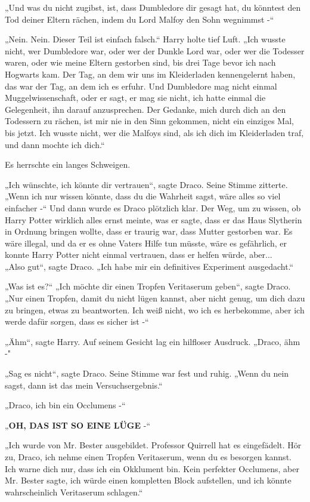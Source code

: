 {„Und was du nicht zugibst, ist, dass Dumbledore dir gesagt hat, du könntest den Tod deiner Eltern rächen, indem du Lord Malfoy den Sohn wegnimmst -“

„Nein. Nein. Dieser Teil ist einfach falsch.“ Harry holte tief Luft. „Ich wusste nicht, wer Dumbledore war, oder wer der Dunkle Lord war, oder wer die Todesser waren, oder wie meine Eltern gestorben sind, bis drei Tage bevor ich nach Hogwarts kam. Der Tag, an dem wir uns im Kleiderladen kennengelernt haben, das war der Tag, an dem ich es erfuhr. Und Dumbledore mag nicht einmal Muggelwissenschaft, oder er sagt, er mag sie nicht, ich hatte einmal die Gelegenheit, ihn darauf anzusprechen. Der Gedanke, mich durch dich an den Todessern zu rächen, ist mir nie in den Sinn gekommen, nicht ein einziges Mal, bis jetzt. Ich wusste nicht, wer die Malfoys sind, als ich dich im Kleiderladen traf, und dann mochte ich dich.“

Es herrschte ein langes Schweigen.

„Ich wünschte, ich könnte dir vertrauen“, sagte Draco. Seine Stimme zitterte. „Wenn ich nur wissen könnte, dass du die Wahrheit sagst, wäre alles so viel einfacher -“ Und dann wurde es Draco plötzlich klar. Der Weg, um zu wissen, ob Harry Potter wirklich alles ernst meinte, was er sagte, dass er das Haus Slytherin in Ordnung bringen wollte, dass er traurig war, dass Mutter gestorben war. Es wäre illegal, und da er es ohne Vaters Hilfe tun müsste, wäre es gefährlich, er konnte Harry Potter nicht einmal vertrauen, dass er helfen würde, aber...\\ „Also gut“, sagte Draco. „Ich habe mir ein definitives Experiment ausgedacht.“

„Was ist es?“ „Ich möchte dir einen Tropfen Veritaserum geben“, sagte Draco. „Nur einen Tropfen, damit du nicht lügen kannst, aber nicht genug, um dich dazu zu bringen, etwas zu beantworten. Ich weiß nicht, wo ich es herbekomme, aber ich werde dafür sorgen, dass es sicher ist -“

„Ähm“, sagte Harry. Auf seinem Gesicht lag ein hilfloser Ausdruck. „Draco, ähm -"

„Sag es nicht“, sagte Draco. Seine Stimme war fest und ruhig. „Wenn du nein sagst, dann ist das mein Versuchsergebnis.“

„Draco, ich bin ein Occlumens -“

„\textbf{OH, DAS IST SO EINE LÜGE} -“

„Ich wurde von Mr. Bester ausgebildet. Professor Quirrell hat es eingefädelt. Hör zu, Draco, ich nehme einen Tropfen Veritaserum, wenn du es besorgen kannst. Ich warne dich nur, dass ich ein Okklument bin. Kein perfekter Occlumens, aber Mr. Bester sagte, ich würde einen kompletten Block aufstellen, und ich könnte wahrscheinlich Veritaserum schlagen.“

}
